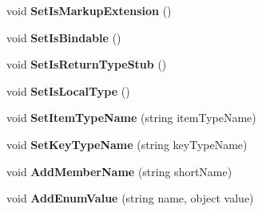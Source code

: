 \begin{DoxyCompactItemize}
\mbox{\label{class_r_f_storage_1_1_r_f_storage___xaml_type_info_1_1_xaml_user_type_a404d7ffdd674f2db677fa8e3e8b6b8e1}} 
void {\bfseries Set\+Is\+Markup\+Extension} ()
\item 
\mbox{\label{class_r_f_storage_1_1_r_f_storage___xaml_type_info_1_1_xaml_user_type_addebb36218c2525c376df813cc809d4f}} 
void {\bfseries Set\+Is\+Bindable} ()
\item 
\mbox{\label{class_r_f_storage_1_1_r_f_storage___xaml_type_info_1_1_xaml_user_type_a2d272b4e9c56e16399213e6423596bca}} 
void {\bfseries Set\+Is\+Return\+Type\+Stub} ()
\item 
\mbox{\label{class_r_f_storage_1_1_r_f_storage___xaml_type_info_1_1_xaml_user_type_a69563c43d28f7bb12f50331f42de12bf}} 
void {\bfseries Set\+Is\+Local\+Type} ()
\item 
\mbox{\label{class_r_f_storage_1_1_r_f_storage___xaml_type_info_1_1_xaml_user_type_a7549d0ac1eb8600b5685f415644fba22}} 
void {\bfseries Set\+Item\+Type\+Name} (string item\+Type\+Name)
\item 
\mbox{\label{class_r_f_storage_1_1_r_f_storage___xaml_type_info_1_1_xaml_user_type_a7aaa97566818dc41f37bc63bbc4f8492}} 
void {\bfseries Set\+Key\+Type\+Name} (string key\+Type\+Name)
\item 
\mbox{\label{class_r_f_storage_1_1_r_f_storage___xaml_type_info_1_1_xaml_user_type_a23495c295256b554abde14aa4d94a0c6}} 
void {\bfseries Add\+Member\+Name} (string short\+Name)
\item 
\mbox{\label{class_r_f_storage_1_1_r_f_storage___xaml_type_info_1_1_xaml_user_type_a2210d3216d053a55a5153376c72d325b}} 
void {\bfseries Add\+Enum\+Value} (string name, object value)
\end{DoxyCompactItemize}
